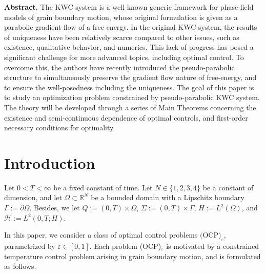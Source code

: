 \documentclass{sinst}
\numberwithin{equation}{section}
\theoremstyle{plain}
\theoremstyle{definition}
\def\R{\mathbb{R}}
\def\sH{\mathscr{H}}
\begin{document}
\vspace{-4ex}

\noindent
{\bf Abstract.}
The KWC system is a well-known generic framework for phase-field models of grain boundary 
motion, whose original formulation is given as a parabolic gradient flow of a free energy. In the 
original KWC system, the results of uniqueness have been relatively scarce compared to other 
issues, such as existence, qualitative behavior, and numerics. This lack of progress has posed a 
significant challenge for more advanced topics, including optimal control. 
To overcome this, the authors have recently introduced the pseudo-parabolic structure to 
simultaneously preserve the gradient flow nature of free-energy, and to ensure the 
well-posedness including the uniqueness. The goal of this paper is to study an optimization
problem constrained by pseudo-parabolic KWC system. The theory will be developed 
through a series of Main Theorems concerning the existence and semi-continuous 
dependence of optimal controls, and first-order necessary conditions for optimality.


\pagebreak 


\section*{Introduction}

Let $ 0 < T < \infty $ be a fixed constant of time. Let $ N \in \{1, 2, 3, 4\} $ be a constant of dimension, and let $ \Omega \subset \R^N $ be a bounded domain with a Lipschitz boundary $ \Gamma := \partial \Omega $. Besides, we let $ Q := (0, T) \times \Omega $, $ \Sigma := (0, T) \times \Gamma $, $ H := L^2(\Omega) $, and $ \sH := L^2(0, T; H) $.

In this paper, we consider a class of optimal control problems $ \mbox{(OCP)}_\varepsilon $, parametrized by $ \varepsilon \in [0, 1] $. Each problem (OCP)$_\varepsilon$ is motivated by a constrained temperature control problem arising in grain boundary motion, and is formulated as follows.
\bigskip
\end{document}
